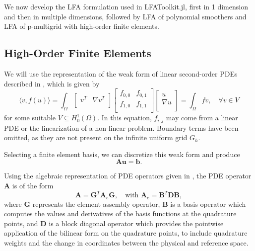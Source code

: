 \documentclass[review]{siamart190516}
\begin{document}
We now develop the LFA formulation used in LFAToolkit.jl, first in 1 dimension and then in multiple dimensions, followed by LFA of polynomial smoothers and LFA of p-multigrid with high-order finite elements.

\subsection{High-Order Finite Elements}\label{sec:highorder}

We will use the representation of the weak form of linear second-order PDEs described in \cite{brown2010efficient}, which is given by
\begin{equation}
\langle v, f \left( u \right) \rangle = \int_{\Omega}
\begin{bmatrix}
  v^T & \nabla v^T    \\
\end{bmatrix}
\begin{bmatrix}
  f_{0, 0} & f_{0, 1} \\
  f_{1, 0} & f_{1, 1} \\
\end{bmatrix}
\begin{bmatrix}
  u                   \\
  \nabla u            \\
\end{bmatrix}
= \int_{\Omega} f v,\quad  \forall v \in V
\end{equation}
for some suitable $V \subseteq H_0^1 \left( \Omega \right)$.
In this equation, $f_{i, j}$ may come from a linear PDE or the linearization of a non-linear problem.
Boundary terms have been omitted, as they are not present on the infinite uniform grid $G_h$.

Selecting a finite element basis, we can discretize this weak form and produce
\begin{equation}\label{pdediscrete}
\mathbf{A} \mathbf{u} = \mathbf{b}.
\end{equation}

Using the algebraic representation of PDE operators given in \cite{brown2010efficient}, the PDE operator $\mathbf{A}$ is of the form
\begin{equation}\label{efficienthighorder}
\mathbf{A} = \mathbf{G}^T \mathbf{A}_e \mathbf{G},\quad \text{with} \,\,\mathbf{A}_e = \mathbf{B}^T \mathbf{D} \mathbf{B},
\end{equation}
where $\mathbf{G}$ represents the element assembly operator, $\mathbf{B}$ is a basis operator which computes the values and derivatives of the basis functions at the quadrature points, and $\mathbf{D}$ is a block diagonal operator which provides the pointwise application of the bilinear form on the quadrature points, to include quadrature weights and the change in coordinates between the physical and reference space.
\end{document}
